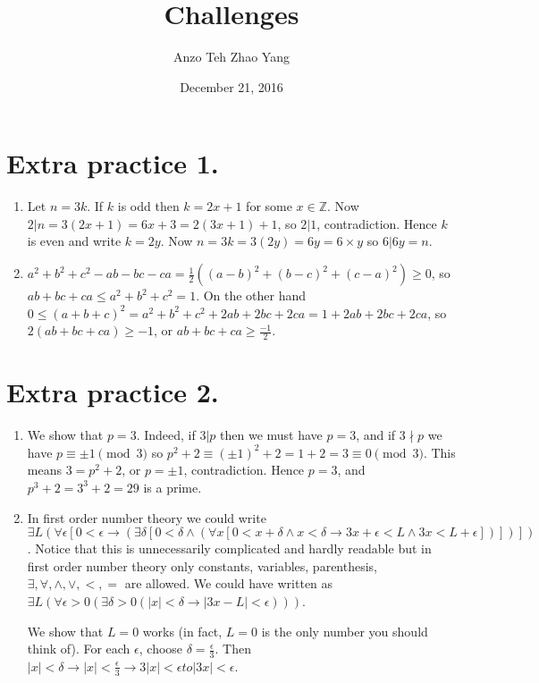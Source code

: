 \documentclass[11pt]{article}
\title{Challenges}
\author{ Anzo Teh Zhao Yang}
\date{December 21, 2016}
\begin{document}
\maketitle

\section {Extra practice 1.}
\begin{enumerate}
\item Let $n=3k$. If $k$ is odd then $k=2x+1$ for some $x\in\mathbb{Z}$. Now $2|n=3(2x+1)=6x+3=2(3x+1)+1$, so $2|1$, contradiction. Hence $k$ is even and write $k=2y$. Now $n=3k=3(2y)=6y=6\times y$ so $6|6y=n$.

\item $a^2+b^2+c^2-ab-bc-ca=\frac12((a-b)^2+(b-c)^2+(c-a)^2)\ge 0$, so $ab+bc+ca\le a^2+b^2+c^2=1$. On the other hand $0\le (a+b+c)^2=a^2+b^2+c^2+2ab+2bc+2ca=1+2ab+2bc+2ca$, so $2(ab+bc+ca)\ge -1$, or $ab+bc+ca\ge\frac{-1}{2}$.
\end{enumerate}

\section {Extra practice 2.}
\begin{enumerate}
\item We show that $p=3$. Indeed, if $3|p$ then we must have $p=3$, and if $3\nmid p$ we have $p\equiv \pm 1\pmod{3}$ so $p^2+2\equiv (\pm 1)^2+2=1+2=3\equiv 0\pmod {3}$. This means $3=p^2+2$, or $p=\pm 1$, contradiction. Hence $p=3$, and $p^3+2=3^3+2=29$ is a prime.

\item In first order number theory we could write $\exists L(\forall\epsilon [0<\epsilon \to(\exists\delta [0<\delta\land (\forall x [0<x+\delta \land x<\delta\to 3x+\epsilon<L\land 3x<L+\epsilon ])])])$. Notice that this is unnecessarily complicated and hardly readable but in first order number theory only constants, variables, parenthesis, $\exists, \forall, \land, \lor, <, =$ are allowed. We could have written as $\exists L(\forall \epsilon>0(\exists\delta>0 (|x|<\delta \to |3x-L|<\epsilon)))$.

We show that $L=0$ works (in fact, $L=0$ is the only number you should think of). For each $\epsilon$, choose $\delta=\frac{\epsilon}{3}$. Then $|x|<\delta\to |x|<\frac{\epsilon}{3}\to 3|x|<\epsilon to |3x|<\epsilon$.

\end{enumerate}
\end{document}
